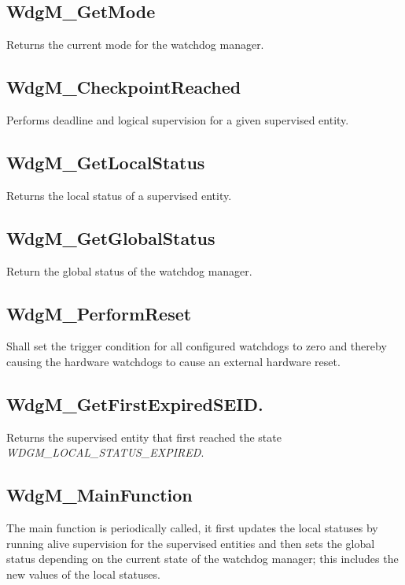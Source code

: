 \subsection{WdgM\_GetMode}
Returns the current mode for the watchdog manager\footnotemark[\thefootnote].
\subsection{WdgM\_CheckpointReached}
\label{SEC:CHECKPOINTREACHED}
Performs deadline and logical supervision for a given supervised entity.
\subsection{WdgM\_GetLocalStatus}
Returns the local status of a supervised entity\footnotemark[\thefootnote].
\subsection{WdgM\_GetGlobalStatus}
Return the global status of the watchdog manager\footnotemark[\thefootnote].
\subsection{WdgM\_PerformReset}
Shall set the trigger condition for all configured watchdogs to zero and
thereby causing the hardware watchdogs to cause an external hardware reset.
\subsection{WdgM\_GetFirstExpiredSEID.}
Returns the supervised entity that first reached the state
\emph{WDGM\_LOCAL\_STATUS\_EXPIRED}\footnotemark[\thefootnote].
\subsection{WdgM\_MainFunction}
\label{SEC:MAINFUNCTION}
The main function is periodically called, it first updates the local statuses by
running alive supervision for the supervised entities and then sets the global
status depending on the current state of the watchdog manager; this includes the
new values of the local statuses.


